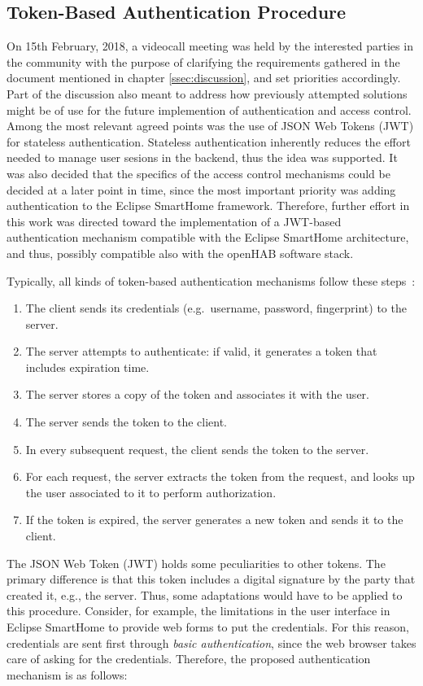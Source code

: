 \documentclass[12pt]{article}
\begin{document}
\subsection{Token-Based Authentication Procedure}

On 15th February, 2018, a videocall meeting was held by the interested parties in the community with the purpose of clarifying the requirements gathered in the document mentioned in chapter \ref{ssec:discussion}, and set priorities accordingly. Part of the discussion also meant to address how previously attempted solutions might be of use for the future implemention of authentication and access control. Among the most relevant agreed points was the use of JSON Web Tokens (JWT) for stateless authentication. Stateless authentication inherently reduces the effort needed to manage user sesions in the backend, thus the idea was supported. It was also decided that the specifics of the access control mechanisms could be decided at a later point in time, since the most important priority was adding authentication to the Eclipse SmartHome framework. Therefore, further effort in this work was directed toward the implementation of a JWT-based authentication mechanism compatible with the Eclipse SmartHome architecture, and thus, possibly compatible also with the openHAB software stack.

Typically, all kinds of token-based authentication mechanisms follow these steps~\cite{token_auth}:
\begin{enumerate}
\item The client sends its credentials (e.g.\ username, password, fingerprint) to the server.
\item The server attempts to authenticate: if valid, it generates a token that includes expiration time.
\item The server stores a copy of the token and associates it with the user.
\item The server sends the token to the client.
\item In every subsequent request, the client sends the token to the server.
\item For each request, the server extracts the token from the request, and looks up the user associated to it to perform authorization.
\item If the token is expired, the server generates a new token and sends it to the client. 
\end{enumerate}

The JSON Web Token (JWT) holds some peculiarities to other tokens. The primary difference is that this token includes a digital signature by the party that created it, e.g., the server. Thus, some adaptations would have to be applied to this procedure. Consider, for example, the limitations in the user interface in Eclipse SmartHome to provide web forms to put the credentials. For this reason, credentials are sent first through \emph{basic authentication}, since the web browser takes care of asking for the credentials. Therefore, the proposed authentication mechanism is as follows:
\end{document}

